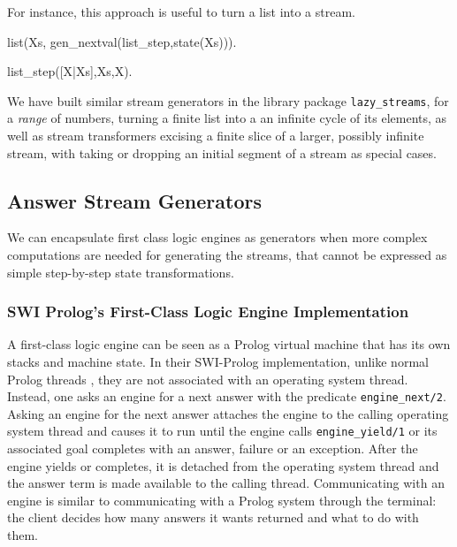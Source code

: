 \documentclass[submission,copyright,creativecommons]{eptcs}
\begin{document}
For instance, this approach is useful to turn a list into a stream.
\begin{code}
list(Xs, gen_nextval(list_step,state(Xs))).

list_step([X|Xs],Xs,X).
\end{code}

% 

We have built similar stream generators in the library package 
{\tt lazy\_streams}, for a {\em range} of numbers, turning a finite list into
a an infinite cycle of its elements, as well as stream 
transformers excising a finite slice of a larger, possibly infinite stream,
with taking or dropping an initial segment of a stream as special cases.

\subsection{Answer Stream Generators}

We can encapsulate first class logic engines as generators  when more
complex computations are needed for generating the streams, that  cannot be
expressed as simple step-by-step state transformations.

\subsubsection{SWI Prolog's First-Class Logic Engine Implementation}

A first-class logic engine \cite{tarau:cl2000,bp2011} can be seen as a Prolog
virtual machine that has its own stacks and machine state.  
In their SWI-Prolog
implementation, unlike normal Prolog threads \cite{swi,swi_threads},
they are
not associated with an operating system thread. Instead, one asks an engine for
a next answer with the predicate {\tt engine\_next/2}. Asking an engine for the
next answer attaches the engine to the calling operating system thread and
causes it to run until the engine calls {\tt engine\_yield/1} or its associated
goal completes with an answer, failure or an exception. After the engine yields
or completes, it is detached from the operating system thread and the answer
term is made available to the calling thread. Communicating with an engine is
similar to communicating with a Prolog system through the terminal: the client
decides how many answers it wants returned and what to do with them.
\end{document}
